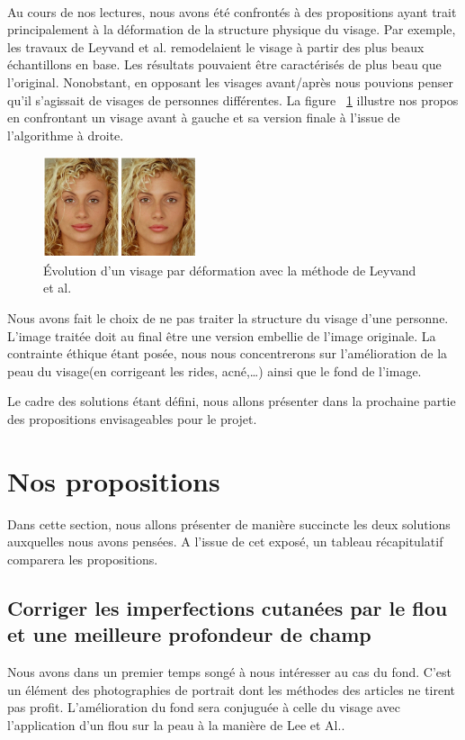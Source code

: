 \documentclass[11pt, french]{report-rd-info}
\begin{document}
\paragraph*{}
Au cours de nos lectures, nous avons été confrontés à des propositions ayant trait principalement à la déformation de la structure physique du visage. Par exemple, les travaux de Leyvand et al.\cite{Leyvand2008} remodelaient le visage à partir des plus beaux échantillons en base. Les résultats pouvaient être caractérisés de plus beau que l’original. Nonobstant, en opposant les visages avant/après nous pouvions penser qu’il s'agissait de visages de personnes différentes. La figure ~\ref{fig:VisagesData} illustre nos propos en confrontant un visage avant à gauche et sa version finale à l’issue de l’algorithme à droite.

\begin{figure}
	\centering
	\includegraphics[width=0.4\textwidth]{Images/ea_data_visages}
	\caption{Évolution d’un visage par déformation avec la méthode de Leyvand et al.\cite{Leyvand2008}}
	\label{fig:VisagesData}
\end{figure}
 
Nous avons fait le choix de ne pas traiter la structure du visage d’une personne. L’image traitée doit au final être une version embellie de l’image originale. La contrainte éthique étant posée,  nous nous concentrerons sur l’amélioration de la peau du visage(en corrigeant les rides, acné,\ldots) ainsi que le fond de l’image. 

Le cadre des solutions étant défini, nous allons présenter dans la prochaine partie des propositions envisageables pour le projet.


\section{Nos propositions}
Dans cette section, nous allons présenter de manière succincte les deux solutions auxquelles nous avons pensées. A l’issue de cet exposé, un tableau récapitulatif comparera les propositions.

\subsection{Corriger les imperfections cutanées par le flou et une meilleure profondeur de champ}
\label{propun}
Nous avons dans un premier temps songé à nous intéresser au cas du fond. C’est un élément des photographies de portrait dont les méthodes des articles ne tirent pas profit. L’amélioration du fond sera conjuguée à celle du visage avec l’application d’un flou sur la peau à la manière de Lee et Al.\cite{Lee}.
\end{document}
